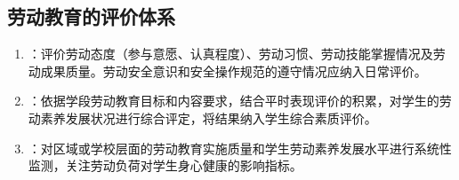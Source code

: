 \subsection{劳动教育的评价体系}

\begin{keybox}
\begin{enumerate}[leftmargin=*]
    \item {}：评价劳动态度（参与意愿、认真程度）、劳动习惯、劳动技能掌握情况及劳动成果质量。劳动安全意识和安全操作规范的遵守情况应纳入日常评价。
    \item {}：依据学段劳动教育目标和内容要求，结合平时表现评价的积累，对学生的劳动素养发展状况进行综合评定，将结果纳入学生综合素质评价。
    \item {}：对区域或学校层面的劳动教育实施质量和学生劳动素养发展水平进行系统性监测，关注劳动负荷对学生身心健康的影响指标。
\end{enumerate}
\end{keybox}

\newpage
